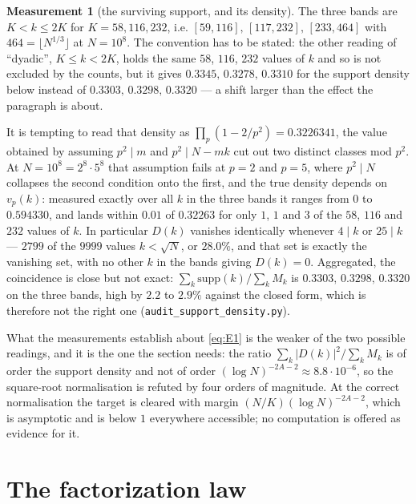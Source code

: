 \documentclass[11pt,a4paper]{article}
\theoremstyle{plain}
\theoremstyle{definition}
\newtheorem{measurement}[theorem]{Measurement}
\theoremstyle{remark}
\begin{document}
\begin{measurement}[the surviving support, and its density]%
\label{meas:supp}
The three bands are $K<k\le2K$ for $K=58,116,232$, i.e.
$[59,116],\,[117,232],\,[233,464]$ with
$464=\lfloor N^{1/3}\rfloor$ at $N=10^8$. The convention has to be
stated: the other reading of ``dyadic'', $K\le k<2K$, holds the same
$58$, $116$, $232$ values of $k$ and so is not excluded by the counts,
but it gives $0.3345,\,0.3278,\,0.3310$ for the support density below
instead of $0.3303,\,0.3298,\,0.3320$ --- a shift larger than the
effect the paragraph is about.

It is tempting to read that density as $\prod_p(1-2/p^2)=0.3226341$,
the value obtained by assuming $p^2\mid m$ and $p^2\mid N-mk$ cut out
two distinct classes mod $p^2$. At $N=10^8=2^8\cdot5^8$ that
assumption fails at $p=2$ and $p=5$, where $p^2\mid N$ collapses the
second condition onto the first, and the true density depends on
$v_p(k)$: measured exactly over all $k$ in the three bands it ranges
from $0$ to $0.594330$, and lands within $0.01$ of $0.32263$ for only
$1$, $1$ and $3$ of the $58$, $116$ and $232$ values of $k$. In
particular $D(k)$ vanishes identically whenever $4\mid k$ or
$25\mid k$ --- $2799$ of the $9999$ values $k<\sqrt N$, or $28.0\%$,
and that set is exactly the vanishing set, with no other $k$ in the
bands giving $D(k)=0$. Aggregated, the coincidence is close but not
exact: $\sum_k\mathrm{supp}(k)/\sum_kM_k$ is
$0.3303,\,0.3298,\,0.3320$ on the three bands, high by $2.2$ to
$2.9\%$ against the closed form, which is therefore not the right one
(\texttt{audit\_support\_density.py}).
\end{measurement}

What the measurements establish about \eqref{eq:E1} is the weaker of
the two possible readings, and it is the one the section needs: the
ratio $\sum_k|D(k)|^2/\sum_kM_k$ is of order the support density and
not of order $(\log N)^{-2A-2}\approx8.8\cdot10^{-6}$, so the
square-root normalisation is refuted by four orders of magnitude. At
the correct normalisation the target is cleared with margin
$(N/K)(\log N)^{-2A-2}$, which is asymptotic and is below $1$
everywhere accessible; no computation is offered as evidence for it.

\section{The factorization law}
\end{document}
